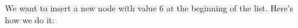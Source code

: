 \documentclass[preview]{standalone}
\begin{document}
We want to insert a new node with value 6 at the beginning of the list. Here's how we do it:\\
\end{document}
